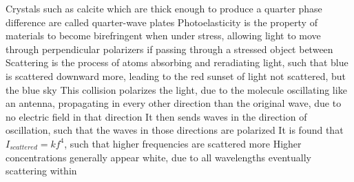 \documentclass[11 pt, twoside]{article}
\newenvironment{outline*}
{
	\begin{outline}[enumerate]
	}
	{\end{outline}
}
\begin{document}
\begin{outline*}
\4 Crystals such as calcite which are thick enough to produce a quarter phase difference are called quarter-wave plates
\4 Photoelasticity is the property of materials to become birefringent when under stress, allowing light to move through perpendicular polarizers if passing through a stressed object between
\1 Scattering is the process of atoms absorbing and reradiating light, such that blue is scattered downward more, leading to the red sunset of light not scattered, but the blue sky
\2 This collision polarizes the light, due to the molecule oscillating like an antenna, propagating in every other direction than the original wave, due to no electric field in that direction
\3 It then sends waves in the direction of oscillation, such that the waves in those directions are polarized
\2 It is found that $I_{scattered} = kf^4$, such that higher frequencies are scattered more
\2 Higher concentrations generally appear white, due to all wavelengths eventually scattering within
\end{outline*}
\end{document}
